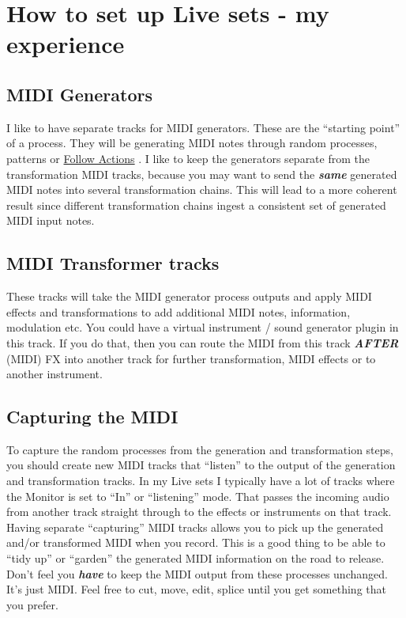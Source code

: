 \documentclass[
  12pt,
  letterpaper,
  oneside,
  open=any]{scrbook}
\begin{document}
\section{How to set up Live sets - my
experience}\label{how-to-set-up-live-sets---my-experience}

\subsection{MIDI Generators}\label{midi-generators}

I like to have separate tracks for MIDI generators. These are the
``starting point'' of a process. They will be generating MIDI notes
through random processes, patterns or
\hyperref[Chapter-003-Process-Follow_Actions]{Follow Actions} . I like
to keep the generators separate from the transformation MIDI tracks,
because you may want to send the \textbf{\emph{same}} generated MIDI
notes into several transformation chains. This will lead to a more
coherent result since different transformation chains ingest a
consistent set of generated MIDI input notes.

\subsection{MIDI Transformer tracks}\label{midi-transformer-tracks}

These tracks will take the MIDI generator process outputs and apply MIDI
effects and transformations to add additional MIDI notes, information,
modulation etc. You could have a virtual instrument / sound generator
plugin in this track. If you do that, then you can route the MIDI from
this track \textbf{\emph{AFTER}} (MIDI) FX into another track for
further transformation, MIDI effects or to another instrument.

\subsection{Capturing the MIDI}\label{capturing-the-midi}

To capture the random processes from the generation and transformation
steps, you should create new MIDI tracks that ``listen'' to the output
of the generation and transformation tracks. In my Live sets I typically
have a lot of tracks where the Monitor is set to ``In'' or ``listening''
mode. That passes the incoming audio from another track straight through
to the effects or instruments on that track. Having separate
``capturing'' MIDI tracks allows you to pick up the generated and/or
transformed MIDI when you record. This is a good thing to be able to
``tidy up'' or ``garden'' the generated MIDI information on the road to
release. Don't feel you \textbf{\emph{have}} to keep the MIDI output
from these processes unchanged. It's just MIDI. Feel free to cut, move,
edit, splice until you get something that you prefer.
\end{document}
